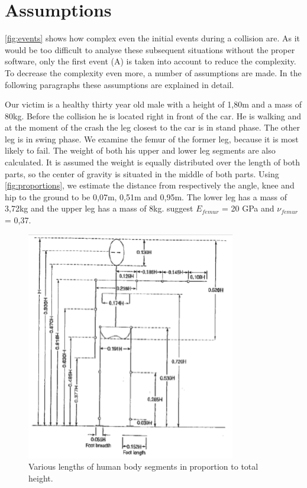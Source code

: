 \section{Assumptions}
\label{sec:assumptions}
\autoref{fig:events} shows how complex even the initial events during a
collision are. As it would be too difficult to analyse these subsequent
situations without the proper software, only the first event (A) is
taken into account to reduce the complexity. To decrease the complexity even
more, a number of assumptions are made. In the following paragraphs these
assumptions are explained in detail.

Our victim is a healthy thirty year old male with a height of 1,80m and a mass
of 80kg. Before the collision he is located right in front of the car.
He is walking and at the moment of the crash the leg closest to the car is in
stand phase. The other leg is in swing phase. We examine the femur of the former
leg, because it is most likely to fail. The weight of both his upper and lower
leg segments are also calculated. It is assumed the weight is equally
distributed over the length of both parts, so the center of gravity is situated
in the middle of both parts. Using \autoref{fig:proportions}, we estimate the
distance from respectively the angle, knee and hip to the ground to be 0,07m,
0,51m and 0,95m. The lower leg has a mass of 3,72kg and the upper leg has a mass
of 8kg\cite{Ob}.  \cite{huiskes1977geometrical}
suggest $E_{femur}$ = 20 GPa and $\nu_{femur}$ = 0,37.

\begin{figure}[htp]
\begin{center}
  \includegraphics{img/proportions.png}
  \caption{Various lengths of human body segments in proportion to
  total height.}
  \label{fig:proportions}
\end{center}
\end{figure}

